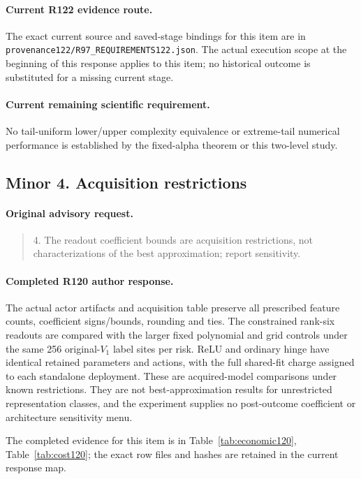 \paragraph{Current R122 evidence route.}
The exact current source and saved-stage bindings for this item are in \nolinkurl{provenance122/R97_REQUIREMENTS122.json}. The actual execution scope at the beginning of this response applies to this item; no historical outcome is substituted for a missing current stage.
\paragraph{Current remaining scientific requirement.}
No tail-uniform lower/upper complexity equivalence or extreme-tail numerical performance is established by the fixed-alpha theorem or this two-level study.

\subsection{Minor 4. Acquisition restrictions}
\label{response122:minor-4}

\paragraph{Original advisory request.}
\begin{quote}
4. The readout coefficient bounds are acquisition restrictions, not characterizations of the best approximation; report sensitivity.
\end{quote}

\paragraph{Completed R120 author response.}
The actual actor artifacts and acquisition table preserve all prescribed feature counts, coefficient signs/bounds, rounding and ties. The constrained rank-six readouts are compared with the larger fixed polynomial and grid controls under the same 256 original-$V_1$ label sites per risk. ReLU and ordinary hinge have identical retained parameters and actions, with the full shared-fit charge assigned to each standalone deployment. These are acquired-model comparisons under known restrictions. They are not best-approximation results for unrestricted representation classes, and the experiment supplies no post-outcome coefficient or architecture sensitivity menu.

The completed evidence for this item is in Table~\ref{tab:economic120}, Table~\ref{tab:cost120}; the exact row files and hashes are retained in the current response map.

